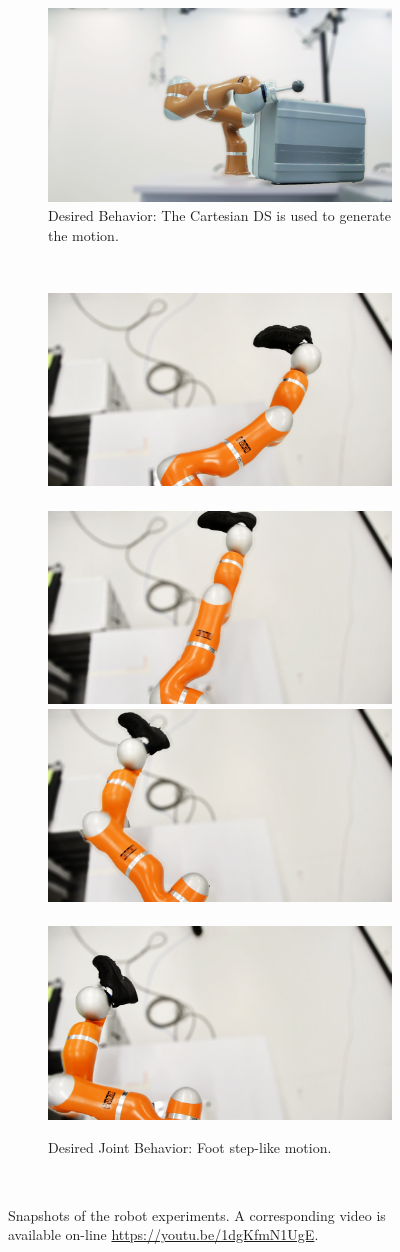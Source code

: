 \documentclass[letterpaper, 10 pt, conference,fleqn]{ieeeconf}
\begin{document}
\begin{figure}[t]
\begin{subfigure}[t]{\linewidth}
		\includegraphics[width=0.32\linewidth]{Pic/Luggage3_SEDS.png}
		\caption{Desired Behavior: The Cartesian DS is used to generate the motion.}
		\label{fig:snapshot:b}
	\end{subfigure}\\
	\begin{subfigure}[t]{\linewidth}
	\centering	
		\includegraphics[width=0.45\linewidth]{Pic/1.png}~~
		\includegraphics[width=0.45\linewidth]{Pic/3.png}\\\vspace{0.1cm}
		\includegraphics[width=0.45\linewidth]{Pic/4.png}~~
		\includegraphics[width=0.45\linewidth]{Pic/2.png}
		\caption{Desired Joint Behavior: Foot step-like motion.}
		\label{fig:snapshot:c}
	\end{subfigure}\\	
	\caption{Snapshots of the robot experiments. A corresponding video is available on-line \href{https://youtu.be/1dgKfmN1UgE}{https://youtu.be/1dgKfmN1UgE}.}
	\label{fig:snapshot}
	\vspace{-0.8cm}
\end{figure}
\end{document}
